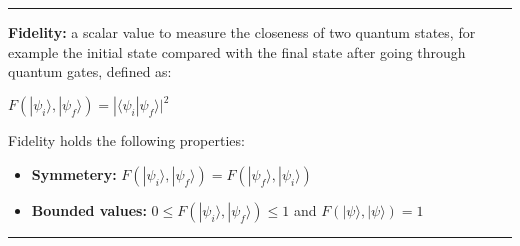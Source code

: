 \documentclass{article}
\begin{document}
 
\vspace{5pt}
\hrule 
\vspace{5pt}


\newpage

\textbf{Fidelity:} a scalar value to measure the closeness of two quantum states, for example the initial state compared with the final state after going through quantum gates, defined as:

\begin{center}

$ F(|\psi_{i}\rangle, |\psi_{f}\rangle) = | \langle \psi_{i} | \psi_{f}\rangle | ^2 $ 

\end{center}

Fidelity holds the following properties:

\begin{itemize}
	\item \textbf{Symmetery:}  $ F(|\psi_{i}\rangle, |\psi_{f}\rangle) = F( |\psi_{f}\rangle, |\psi_{i}\rangle ) $
	\item \textbf{Bounded values:}  $ 0 \le F(|\psi_{i}\rangle, |\psi_{f}\rangle) \le 1$ and $ F(|\psi\rangle,|\psi\rangle) = 1 $
\end{itemize}

\vspace{5pt}
\hrule 
\vspace{5pt}
\end{document}
